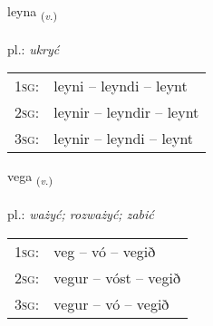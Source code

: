 \documentclass[frontgrid, backgrid]{flacards}\usepackage[]{graphicx}\usepackage[]{xcolor}
\begin{document}
\renewcommand{\blhead}{\vskip5pt {\small\bfseries\footnotesize Sagnorð | Verb }}
\renewcommand{\bcfoot}{\vskip5pt \hspace{2pt}{\small\bfseries\footnotesize 2K}}


{leyna \small{\textsubscript{(\textit{v.})}} \\[1ex] %
\textphonetic{[leiːna]} \\
pl.: \emph{ukryć} \\  [2ex]
\renewcommand*{\arraystretch}{0.8}
\begin{tabular}{p{1cm}l}
\textsc{1sg}: & leyni -- leyndi -- leynt \\ 
\textsc{2sg}: & leynir -- leyndir -- leynt \\ 
\textsc{3sg}: & leynir -- leyndi -- leynt \\ 
\end{tabular}
}

\renewcommand{\flhead}{\vskip5pt \fboxsep=0pt {\small\bfseries\footnotesize Sagnorð | Verb}}
\renewcommand{\fcfoot}{\vskip5pt \fboxsep=0pt \hspace{2pt}{\small\bfseries\footnotesize 2K}}

\renewcommand{\blhead}{\vskip5pt {\small\bfseries\footnotesize Sagnorð | Verb }}
\renewcommand{\bcfoot}{\vskip5pt \hspace{2pt}{\small\bfseries\footnotesize 2K}}


{vega \small{\textsubscript{(\textit{v.})}} \\[1ex] %
\textphonetic{[vɛːɣa]} \\
pl.: \emph{ważyć; rozważyć; zabić} \\  [2ex]
\renewcommand*{\arraystretch}{0.8}
\begin{tabular}{p{1cm}l}
\textsc{1sg}: & veg -- vó -- vegið \\ 
\textsc{2sg}: & vegur -- vóst -- vegið \\ 
\textsc{3sg}: & vegur -- vó -- vegið \\ 
\end{tabular}
}
\end{document}
